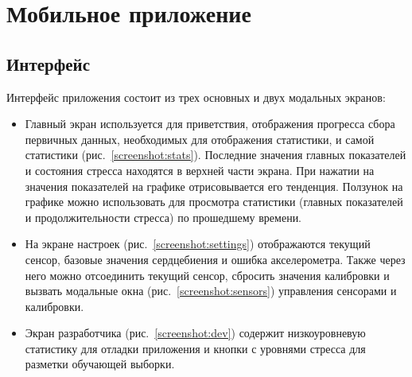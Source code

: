 \documentclass[14pt]{matmex-diploma-custom}
\begin{document}
\section{Мобильное приложение}
\subsection{Интерфейс}
Интерфейс приложения состоит из трех основных и двух модальных экранов:

\begin{itemize}
\item Главный экран используется для приветствия, отображения прогресса сбора
  первичных данных, необходимых для отображения статистики, и самой статистики
  (рис.~\ref{screenshot:stats}). Последние значения главных показателей и
  состояния стресса находятся в верхней части экрана. При нажатии на значения
  показателей на графике отрисовывается его тенденция. Ползунок на графике можно
  использовать для просмотра статистики (главных показателей и продолжительности
  стресса) по прошедшему времени.
\item На экране настроек (рис.~\ref{screenshot:settings}) отображаются текущий
  сенсор, базовые значения сердцебиения и ошибка акселерометра. Также через него
  можно отсоединить текущий сенсор, сбросить значения калибровки и вызвать
  модальные окна (рис.~\ref{screenshot:sensors}) управления сенсорами и
  калибровки.
\item Экран разработчика (рис.~\ref{screenshot:dev}) содержит низкоуровневую
  статистику для отладки приложения и кнопки с уровнями стресса для разметки
  обучающей выборки.
\end{itemize}
\end{document}
